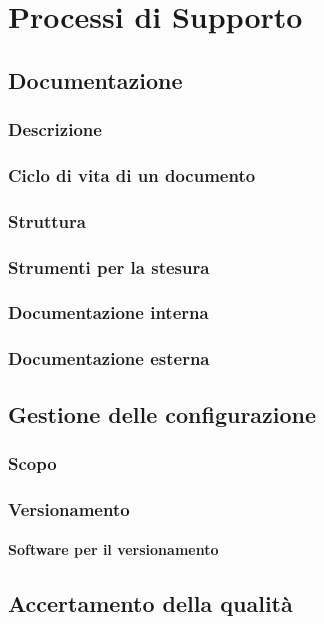 \section{Processi di Supporto}
    \subsection{Documentazione}
        \subsubsection{Descrizione}
        \subsubsection{Ciclo di vita di un documento}
        \subsubsection{Struttura}
        \subsubsection{Strumenti per la stesura}
        \subsubsection{Documentazione interna}
        \subsubsection{Documentazione esterna}

    \subsection{Gestione delle configurazione}
        \subsubsection{Scopo}
        \subsubsection{Versionamento}
    
            \paragraph{Software per il versionamento}
            

    \subsection{Accertamento della qualità}
